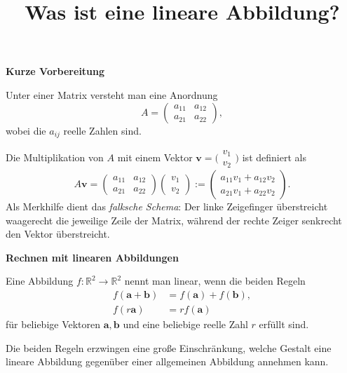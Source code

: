 \documentclass[9pt]{beamer}
\title{Was ist eine lineare Abbildung?}
\date{}
\newcommand{\bv}[1]{\mathbf{#1}}
\newcommand{\R}{\mathbb R}
\newcommand{\strong}[1]{\textsf{\textbf{#1}}}
\newcommand{\icol}[1]{
  \big(\!\begin{smallmatrix}#1\end{smallmatrix}\!\big)%
}
\newcommand{\parspace}{\vspace{0.8em}}
\begin{document}
\begin{frame}
\maketitle
\end{frame}

\begin{frame}
\begin{center}
\strong{Kurze Vorbereitung}
\end{center}
\end{frame}

\begin{frame}
Unter einer Matrix versteht man eine Anordnung
\[A = \begin{pmatrix}
a_{11} & a_{12}\\
a_{21} & a_{22}
\end{pmatrix},\]
wobei die $a_{ij}$ reelle Zahlen sind.

\parspace
Die Multiplikation von $A$ mit einem Vektor
$\bv v = \icol{v_1\\ v_2}$ ist definiert als
\[A\bv v = \begin{pmatrix}
a_{11} & a_{12}\\
a_{21} & a_{22}
\end{pmatrix}\begin{pmatrix}v_1 \\ v_2\end{pmatrix}
:= \begin{pmatrix}a_{11}v_1+a_{12}v_2 \\ a_{21}v_1+a_{22}v_2\end{pmatrix}.\]
{\footnotesize{}Als Merkhilfe dient das \emph{falksche Schema}: Der
linke Zeigefinger überstreicht waagerecht die jeweilige Zeile der
Matrix, während der rechte Zeiger senkrecht den Vektor überstreicht.}
\end{frame}

\begin{frame}
\begin{center}
\strong{Rechnen mit linearen Abbildungen}
\end{center}
\end{frame}

\begin{frame}
Eine Abbildung $f\colon\R^2\to\R^2$ nennt man linear, wenn die
beiden Regeln
\begin{align*}
f(\bv a+\bv b) &= f(\bv a)+f(\bv b),\\
f(r\bv a) &= rf(\bv a)
\end{align*}
für beliebige Vektoren $\bv a,\bv b$ und eine beliebige reelle Zahl
$r$ erfüllt sind.

\parspace
Die beiden Regeln erzwingen eine große Einschränkung, welche
Gestalt eine lineare Abbildung gegenüber einer allgemeinen Abbildung
annehmen kann.
\end{frame}
\end{document}
